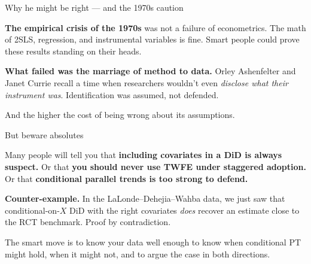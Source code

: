\documentclass[aspectratio=169,12pt,t]{beamer}
\begin{document}
\begin{frame}{Why he might be right --- and the 1970s caution}
\vspace{0.4cm}

\textbf{The empirical crisis of the 1970s} was not a failure of econometrics. \;The math of 2SLS, regression, and instrumental variables is fine. \;Smart people could prove these results standing on their heads.

\vspace{0.5cm}

\textbf{What failed was the marriage of method to data.} \;Orley Ashenfelter and Janet Currie recall a time when researchers wouldn't even \textit{disclose what their instrument was}. \;Identification was assumed, not defended.

\vspace{0.5cm}

 \;And the higher the cost of being wrong about its assumptions.
\end{frame}

\begin{frame}{But beware absolutes}
\vspace{0.5cm}

Many people will tell you that \textbf{including covariates in a DiD is always suspect.} \;Or that \textbf{you should never use TWFE under staggered adoption.} \;Or that \textbf{conditional parallel trends is too strong to defend.}

\vspace{0.5cm}

\textbf{Counter-example.} \;In the LaLonde--Dehejia--Wahba data, we just saw that conditional-on-$X$ DiD with the right covariates \textit{does} recover an estimate close to the RCT benchmark. \;Proof by contradiction.

\vspace{0.5cm}

 \;The smart move is to know your data well enough to know when conditional PT might hold, when it might not, and to argue the case in both directions.
\end{frame}
\end{document}
